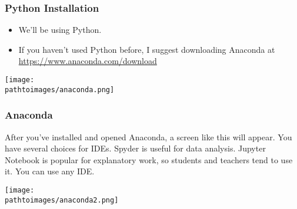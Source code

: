 \documentclass{beamer}
\newcommand{\pathtoimages}{/Users/charlesrambo/Desktop/Bootcamp24/Images}
\begin{document}
\begin{frame}
\frametitle{Python Installation}
\begin{itemize}
\item We'll be using Python.
\item If you haven't used Python before, I suggest downloading Anaconda at  \url{https://www.anaconda.com/download}
\end{itemize}
\begin{center}
\texttt{[image: \\pathtoimages/anaconda.png]}
\end{center}
\end{frame}

\begin{frame}
\frametitle{Anaconda}

After you've installed and opened Anaconda, a screen like this will appear. You have several choices for IDEs. Spyder is useful for data analysis. Jupyter Notebook is popular for explanatory work, so students and teachers tend to use it. You can use any IDE.
\begin{center}
\texttt{[image: \\pathtoimages/anaconda2.png]}
\end{center}
\end{frame}


\end{document}
